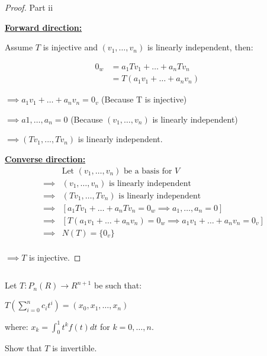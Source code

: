 \documentclass{article}
\newenvironment{customthm}[1]
  {\renewcommand\theinnercustomthm{#1}\innercustomthm}
  {\endinnercustomthm}
\begin{document}
\begin{proof}{Part ii}
  $ $

  \textbf{\underline{Forward direction: }} 
  
  Assume $T$ is injective and $(v_1,\ldots, v_n)$ is linearly independent, then:

  \begin{align*}
    0_w &= a_1Tv_1 + \ldots + a_n Tv_n &&\\
    &= T(a_1v_1 + \ldots + a_nv_n)
  \end{align*}

  \noindent
  $\implies a_1v_1 + \ldots + a_nv_n = 0_v$ \qquad (Because T is injective)

  \noindent
  $\implies a1,\ldots,a_n = 0$ \qquad (Because $(v_1, \ldots, v_n)$ is linearly independent)

  \noindent
  $\implies (Tv_1,...,Tv_n)$ is linearly independent.

  \textbf{\underline{Converse direction: }}
  \begin{align*}
    &\text{Let } (v_1,\ldots,v_n) \text{ be a basis for } V \\
    \implies& (v_1,\ldots,v_n) \text { is linearly independent} \\
    \implies& (Tv_1,\ldots,Tv_n) \text { is linearly independent} \\
    \implies& [a_1 Tv_1 + \ldots + a_n Tv_n = 0_w \implies a_1,\ldots,a_n = 0] \\
    \implies& [T(a_1 v_1+\ldots+a_n v_n) = 0_w \implies a_1 v_1 + \ldots + a_n v_n = 0_v] \\
    \implies& N(T) = \{ 0_v \} \\
  \end{align*}

  \noindent
  $\implies T$ is injective.

\end{proof}
\newpage

\begin{customthm}{7}[2023.S(2.A)]
  $ $

  Let $T: P_n(R) \rightarrow R^{n+1}$ be such that:

  \qquad $T(\sum_{i=0}^{n} c_it^i) = (x_0, x_1,\ldots, x_n)$

  where: $x_k = \int_{0}^{1} t^k f(t)dt$ \qquad for $k = 0,\ldots,n$.
  \newline
  
  Show that $T$ is invertible.

\end{customthm}
\end{document}
